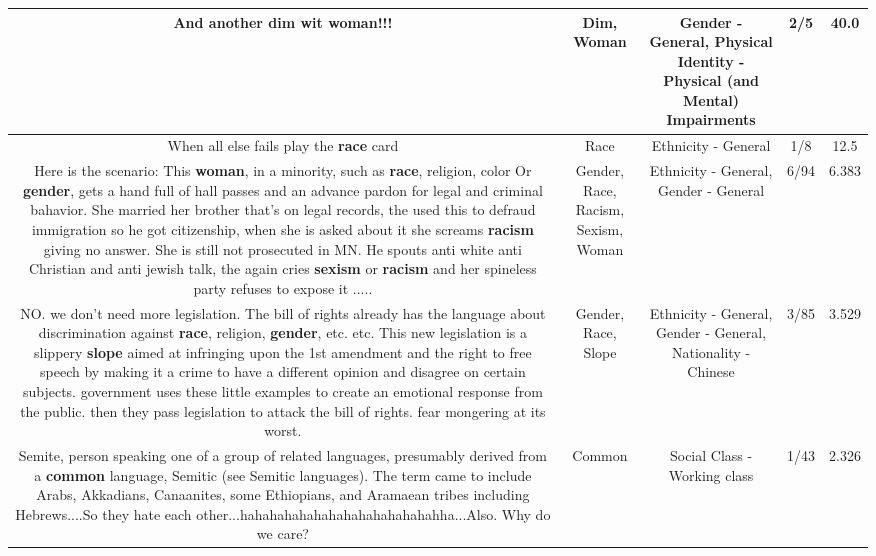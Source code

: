 \documentclass[11pt]{article}
\newlength\mylength
\begin{document}
\begin{center}
\begin{longtable}{|C{.65\mylength}|C{.30\mylength}|C{.12\mylength}|C{.12\mylength}|C{.12\mylength}|}
  \small And another \textbf{dim} wit \textbf{woman}!!!\normalsize   & Dim, Woman & Gender - General, Physical Identity - Physical (and Mental) Impairments & 2/5 & 40.0 \\  \hline
  \small When all else fails play the \textbf{race} card\normalsize   & Race & Ethnicity - General & 1/8 & 12.5 \\  \hline
  \small Here is the scenario: This \textbf{woman}, in a minority, such as \textbf{race}, religion, color Or \textbf{gender}, gets a hand full of hall passes and an advance pardon for legal and criminal bahavior. She married her brother that's on legal records, the used this to defraud immigration so he got citizenship, when she is asked about it she screams \textbf{racism} giving no answer.  She is still not prosecuted in MN.  He spouts anti white anti Christian and anti jewish talk, the again cries \textbf{sexism} or \textbf{racism} and her spineless party refuses to expose it .....\normalsize   & Gender, Race, Racism, Sexism, Woman & Ethnicity - General, Gender - General & 6/94 & 6.383 \\  \hline
  \small NO.  we don't need more legislation.  The bill of rights already has the language about discrimination against \textbf{race}, religion, \textbf{gender}, etc. etc.  This new legislation is a slippery \textbf{slope} aimed at infringing upon the 1st amendment and the right to free speech by making it a crime to have a different opinion and disagree on certain subjects.  government uses these little examples to create an emotional response from the public.  then they pass legislation to attack the bill of rights.  fear mongering at its worst.\normalsize   & Gender, Race, Slope & Ethnicity - General, Gender - General, Nationality - Chinese & 3/85 & 3.529 \\  \hline
  \small Semite, person speaking one of a group of related languages, presumably derived from a \textbf{common} language, Semitic (see Semitic languages). The term came to include Arabs, Akkadians, Canaanites, some Ethiopians, and Aramaean tribes including Hebrews....So they hate each other...hahahahahahahahahahahahahahha...Also. Why do we care?\normalsize   & Common & Social Class - Working class & 1/43 & 2.326 \\  \hline

\end{longtable}
\end{center}
\end{document}
